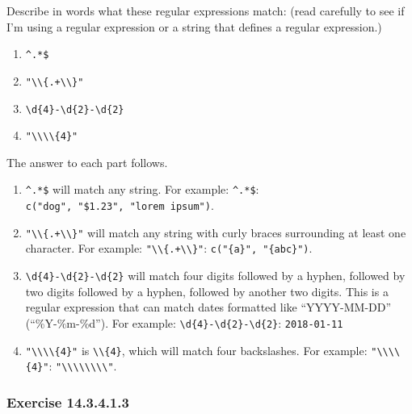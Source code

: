 \documentclass[]{book}
\providecommand{\tightlist}{%
  \setlength{\itemsep}{0pt}\setlength{\parskip}{0pt}}
\theoremstyle{plain}
\theoremstyle{remark}
\begin{document}
Describe in words what these regular expressions match: (read carefully
to see if I'm using a regular expression or a string that defines a
regular expression.)

\begin{enumerate}
\def\labelenumi{\arabic{enumi}.}
\tightlist
\item
  \texttt{\^{}.*\$}
\item
  \texttt{"\textbackslash{}\textbackslash{}\{.+\textbackslash{}\textbackslash{}\}"}
\item
  \texttt{\textbackslash{}d\{4\}-\textbackslash{}d\{2\}-\textbackslash{}d\{2\}}
\item
  \texttt{"\textbackslash{}\textbackslash{}\textbackslash{}\textbackslash{}\{4\}"}
\end{enumerate}

The answer to each part follows.

\begin{enumerate}
\def\labelenumi{\arabic{enumi}.}
\item
  \texttt{\^{}.*\$} will match any string. For example:
  \texttt{\^{}.*\$}: \texttt{c("dog",\ "\$1.23",\ "lorem\ ipsum")}.
\item
  \texttt{"\textbackslash{}\textbackslash{}\{.+\textbackslash{}\textbackslash{}\}"}
  will match any string with curly braces surrounding at least one
  character. For example:
  \texttt{"\textbackslash{}\textbackslash{}\{.+\textbackslash{}\textbackslash{}\}"}:
  \texttt{c("\{a\}",\ "\{abc\}")}.
\item
  \texttt{\textbackslash{}d\{4\}-\textbackslash{}d\{2\}-\textbackslash{}d\{2\}}
  will match four digits followed by a hyphen, followed by two digits
  followed by a hyphen, followed by another two digits. This is a
  regular expression that can match dates formatted like ``YYYY-MM-DD''
  (``\%Y-\%m-\%d''). For example:
  \texttt{\textbackslash{}d\{4\}-\textbackslash{}d\{2\}-\textbackslash{}d\{2\}}:
  \texttt{2018-01-11}
\item
  \texttt{"\textbackslash{}\textbackslash{}\textbackslash{}\textbackslash{}\{4\}"}
  is \texttt{\textbackslash{}\textbackslash{}\{4\}}, which will match
  four backslashes. For example:
  \texttt{"\textbackslash{}\textbackslash{}\textbackslash{}\textbackslash{}\{4\}"}:
  \texttt{"\textbackslash{}\textbackslash{}\textbackslash{}\textbackslash{}\textbackslash{}\textbackslash{}\textbackslash{}\textbackslash{}"}.
\end{enumerate}

\hypertarget{exercise-14.3.4.1.3}{%
\subsubsection*{\texorpdfstring{Exercise
{14.3.4.1.3}}{Exercise 14.3.4.1.3}}\label{exercise-14.3.4.1.3}}
\end{document}
